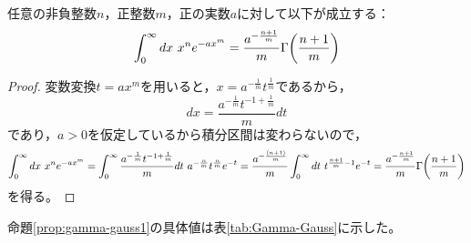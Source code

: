 \documentclass[a4paper,draft]{ltjsarticle}
\begin{document}
\begin{prop}[Gauss積分の一般化 その1]\label{prop:gamma-gauss1}
    任意の非負整数$n$，正整数$m$，正の実数$a$に対して以下が成立する：
    \begin{equation}
        \int_0^\infty dx\ x^n e^{-ax^{m}}=\frac{a^{-\frac{n+1}{m}}}{m}\fun{\Gamma}{\frac{n+1}{m}}
    \end{equation}
    \begin{proof}
        変数変換$t=ax^m$を用いると，$x=a^{-\frac{1}{m}}t^{\frac{1}{m}}$であるから，
        \begin{equation}
            dx=\frac{a^{-\frac{1}{m}}t^{-1+\frac{1}{m}}}{m}dt
        \end{equation}
        であり，$a>0$を仮定しているから積分区間は変わらないので，
        \begin{equation}
            \int_0^\infty dx\ x^n e^{-ax^{m}}
            =\int_0^\infty \frac{a^{-\frac{1}{m}}t^{-1+\frac{1}{m}}}{m}dt\ a^{-\frac{n}{m}}t^{\frac{n}{m}}e^{-t}
            =\frac{a^{-\frac{\pare{n+1}}{m}}}{m}\int_0^\infty dt\ t^{\frac{n+1}{m}-1}e^{-t}
            =\frac{a^{-\frac{n+1}{m}}}{m}\fun{\Gamma}{\frac{n+1}{m}}
        \end{equation}
        を得る。
    \end{proof}
\end{prop}

\begin{eg}
    命題\ref{prop:gamma-gauss1}の具体値は表\ref{tab:Gamma-Gauss}に示した。
\end{eg}
\end{document}
